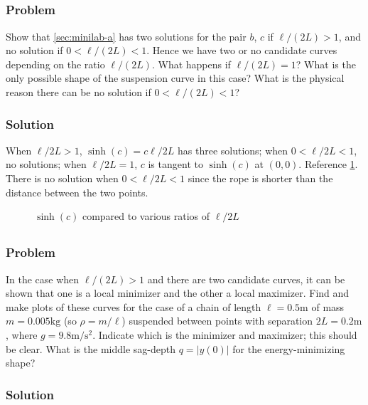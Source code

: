 \documentclass[12pt,twoside]{article}
\begin{document}
\subsection{}
\subsubsection*{Problem}
Show that \cref{sec:minilab-a} has two solutions for the pair $b$, $c$ if
$\ell/(2L)>1$, and no solution if $0<\ell/(2L)<1$. Hence we have two or no
candidate curves depending on the ratio $\ell/(2L)$. What happens if
$\ell/(2L)=1$? What is the only possible shape of the suspension curve in this
case? What is the physical reason there can be no solution if $0<\ell/(2L)<1$?

\subsubsection*{Solution}
When $\ell/2L>1$, $\sinh(c)=c\ell/2L$ has three solutions; when $0<\ell/2L<1$,
no solutions; when $\ell/2L=1$, $c$ is tangent to $\sinh(c)$ at $(0,0)$.
Reference \cref{fig:minilab-c}. There is no solution when $0<\ell/2L<1$ since
the rope is shorter than the distance between the two points.

\begin{figure}[htp]
  \centering
  \caption{$\sinh(c)$ compared to various ratios of $\ell/2L$}
  \label{fig:minilab-c}
\end{figure}


\subsection{}
\subsubsection*{Problem}
In the case when $\ell/(2L)>1$ and there are two candidate curves, it can be
shown that one is a local minimizer and the other a local maximizer. Find and
make plots of these curves for the case of a chain of length $\ell=0.5\text{m}$
of mass $m=0.005\text{kg}$ (so $\rho=m/\ell$) suspended between points with
separation $2L=0.2\text{m}$, where $g=9.8\text{m/s$^2$}$. Indicate which is the
minimizer and maximizer; this should be clear. What is the middle sag-depth
$q=|y(0)|$ for the energy-minimizing shape?

\subsubsection*{Solution}
\todo{}
\end{document}
